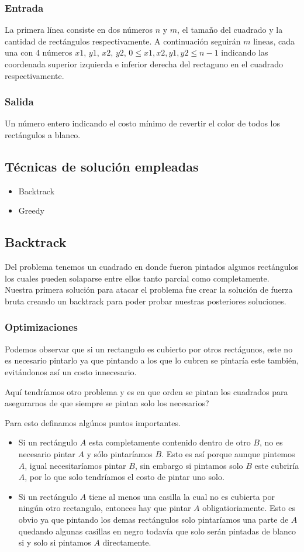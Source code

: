 \documentclass{article}
\begin{document}
	\subsubsection{Entrada}
	La primera línea consiste en dos números $n$ y $m$, el tamaño del cuadrado y la cantidad de rectángulos respectivamente. A continuación seguirán $m$ lineas, cada una con 4 números $x1$, $y1$, $x2$, $y2$, $0 \leq x1,x2,y1,y2 \leq n-1$ indicando las coordenada superior izquierda e inferior derecha del rectaguno en el cuadrado respectivamente.
	\subsubsection{Salida}
	Un número entero indicando el costo mínimo de revertir el color de todos los rectángulos a blanco.
	\subsection{Técnicas de solución empleadas}
	\begin{itemize}
	\item Backtrack
	\item Greedy
	\end{itemize}
	
	\subsection{Backtrack}
	Del problema tenemos un cuadrado en donde fueron pintados algunos rectángulos los cuales pueden solaparse entre ellos tanto parcial como completamente. Nuestra primera solución para atacar el problema fue crear la solución de fuerza bruta creando un backtrack para poder probar nuestras posteriores soluciones.
	\subsubsection{Optimizaciones}
	Podemos observar que si un rectangulo es cubierto por otros rectágunos, este no es necesario pintarlo ya que pintando a los que lo cubren se pintaría este también, evitándonos así un costo innecesario.

Aquí tendríamos otro problema y es en que orden se pintan los cuadrados para asegurarnos de que siempre se pintan solo los necesarios?

Para esto definamos algúnos puntos importantes. 
\begin{itemize}

\item Si un rectángulo $A$ esta completamente contenido dentro de otro $B$, no es necesario pintar $A$ y sólo pintaríamos $B$. Esto es así porque aunque pintemos $A$, igual necesitaríamos pintar $B$, sin embargo si pintamos solo $B$ este cubriría $A$, por lo que solo tendríamos el costo de pintar uno solo.
\item Si un rectángulo $A$ tiene al menos una casilla la cual no es cubierta por ningún otro rectangulo, entonces hay que pintar $A$ obligatioriamente. Esto es obvio ya que pintando los demas rectángulos solo pintaríamos una parte de $A$ quedando algunas casillas en negro todavía que solo serán pintadas de blanco si y solo si pintamos $A$ directamente.
\end{itemize}
\end{document}
